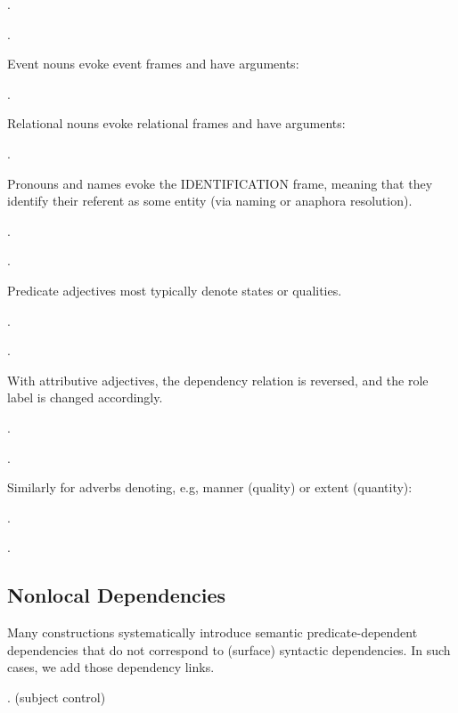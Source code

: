 \documentclass[a4paper]{article}
\newcommand{\fr}[1]{\textsf{#1}}
\newcommand{\rl}[1]{\textsf{#1}}
\begin{document}
\ex.

\ex.

Event nouns evoke event frames and have arguments:

\ex.

Relational nouns evoke relational frames and have arguments:

\ex.

Pronouns and names evoke the \fr{IDENTIFICATION} frame, meaning that they
identify their referent as some entity (via naming or anaphora resolution).

\ex.

\ex.

Predicate adjectives most typically denote states or qualities.

\ex.

\ex.

With attributive adjectives, the dependency relation is reversed, and the role label is changed accordingly.

\ex.

\ex.

Similarly for adverbs denoting, e.g, manner (\rl{quality}) or extent (\rl{quantity}):

\ex.

\ex.


\newpage\subsection{Nonlocal Dependencies}
\label{sec:control}


Many constructions systematically introduce semantic predicate-dependent
dependencies that do not correspond to (surface) syntactic dependencies. In
such cases, we add those dependency links.

\ex. (subject control)
\end{document}
